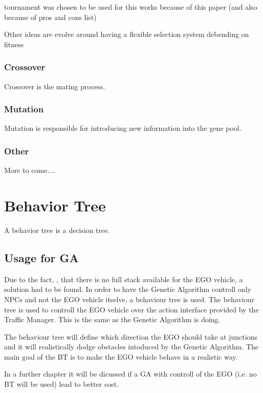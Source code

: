 tournament was chosen to be used for this works because of this paper (and also because of pros and cons list)

Other ideas are evolve around having a flexible selection system debending on fitness 

\subsubsection{Crossover}
Crossover is the mating process.


\subsubsection{Mutation}
Mutation is responsible for introducing new information into the gene pool.


\subsubsection{Other}
More to come....

\section{Behavior Tree}
A behavior tree is a decision tree. 

\subsection{Usage for GA}
Due to the fact, , that there is no full stack available for the EGO vehicle, a solution had to be found.
In order to have the Genetic Algorithm controll only NPCs and not the EGO vehicle itselve, a behaviour tree is used.
The behaviour tree is used to controll the EGO vehicle over the action interface provided by the Traffic Manager. This is the same as the Genetic Algorithm is doing.

The behaviour tree will define which direction the EGO should take at junctions and it will realistically dodge obstacles intoduced by the Genetic Algorithm. The main goal of the BT is to make the EGO vehicle behave in a realistic way.

In a further chapter it will be dicussed if a GA with controll of the EGO (i.e. no BT will be used) lead to better cost.


